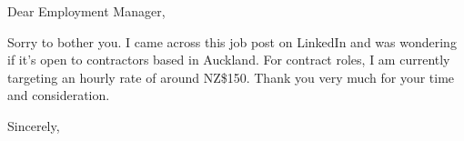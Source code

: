 \begin{letter}{}
\opening{Dear Employment Manager,} 

\noindent Sorry to bother you. I came across this job post on LinkedIn and was wondering if it's open to contractors based in Auckland. For contract roles, I am currently targeting an hourly rate of around NZ\$150. Thank you very much for your time and consideration.


\closing{Sincerely,} 


\end{letter}


